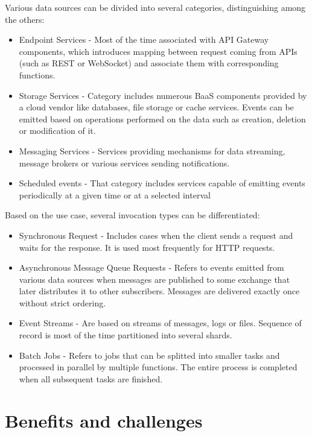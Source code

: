 Various data sources can be divided into several categories, distinguishing among the others:

\begin{itemize}
    \item Endpoint Services - Most of the time associated with API Gateway components, which introduces mapping between request coming from APIs (such as REST or WebSocket) and associate them with corresponding functions.
    \item Storage Services - Category includes numerous BaaS components provided by a cloud vendor like databases, file storage or cache services. Events can be emitted based on operations performed on the data such as creation, deletion or modification of it.
    \item Messaging Services - Services providing mechanisms for data streaming, message brokers or various services sending notifications.
    \item Scheduled events - That category includes services capable of emitting events periodically at a given time or at a selected interval
\end{itemize}

Based on the use case, several invocation types can be differentiated:

\begin{itemize}
    \item Synchronous Request - Includes cases when the client sends a request and waits for the response. It is used most frequently for HTTP requests.
    \item Asynchronous Message Queue Requests - Refers to events emitted from various data sources when messages are published to some exchange that later distributes it to other subscribers. Messages are delivered exactly once without strict ordering.
    \item Event Streams - Are based on streams of messages, logs or files. Sequence of record is most of the time partitioned into several shards.
    \item Batch Jobs - Refers to jobs that can be splitted into smaller tasks and processed in parallel by multiple functions. The entire process is completed when all subsequent tasks are finished.
\end{itemize}

\section{Benefits and challenges} \label{chapter:serverless-benefits-and-challenges}

